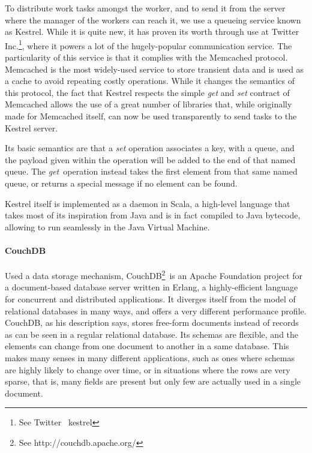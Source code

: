 To distribute work tasks amongst the worker, and to send it from the server where the manager of the workers can reach it, we use a queueing service known as Kestrel. While it is quite new, it has proven its worth through use at Twitter Inc.\footnote{See Twitter \amper\ kestrel}, where it powers a lot of the hugely-popular communication service. The particularity of this service is that it complies with the Memcached protocol. Memcached is the most widely-used service to store transient data and is used as a cache to avoid repeating costly operations. While it changes the semantics of this protocol, the fact that Kestrel respects the simple \emph{get} and \emph{set} contract of Memcached allows the use of a great number of libraries that, while originally made for Memcached itself, can now be used transparently to send tasks to the Kestrel server.

Its basic semantics are that a \emph{set} operation associates a key, with a queue, and the payload given within the operation will be added to the end of that named queue. The \emph{get}\ operation instead takes the first element from that same named queue, or returns a special message if no element can be found.

Kestrel itself is implemented as a daemon in Scala, a high-level language that takes most of its inspiration from Java and is in fact compiled to Java bytecode, allowing to run seamlessly in the Java Virtual Machine.


\paragraph{CouchDB} %
\label{par:couchdb}

Used a data storage mechanism, CouchDB\footnote{See http://couchdb.apache.org/}\ is an Apache Foundation project for a document-based database server written in Erlang, a highly-efficient language for concurrent and distributed applications. It diverges itself from the model of relational databases in many ways, and offers a very different performance profile. CouchDB, as his description says, stores free-form documents instead of records as can be seen in a regular relational database. Its schemas are flexible, and the elements can change from one document to another in a same database. This makes many senses in many different applications, such as ones where schemas are highly likely to change over time, or in situations where the rows are very sparse, that is, many fields are present but only few are actually used in a single document.

